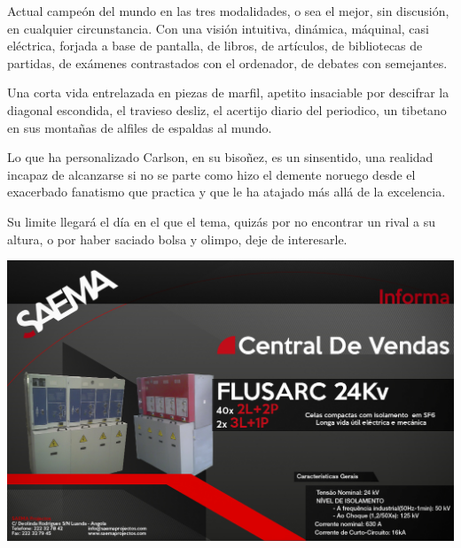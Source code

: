 Actual campeón del mundo en las tres modalidades, o sea el mejor, sin discusión, en cualquier circunstancia. Con una visión intuitiva, dinámica, máquinal, casi eléctrica, forjada a base de pantalla, de libros, de artículos, de bibliotecas de partidas, de exámenes contrastados con el ordenador, de debates con semejantes.

Una corta vida entrelazada en piezas de marfil, apetito insaciable por descifrar la diagonal escondida, el travieso desliz, el acertijo diario del periodico, un tibetano en sus montañas de alfiles de espaldas al mundo.

Lo que ha personalizado Carlson, en su bisoñez, es un sinsentido, una realidad incapaz de alcanzarse si no se parte como hizo el demente noruego desde el exacerbado fanatismo que practica y que le ha atajado más allá de la excelencia.

Su limite llegará el día en el que el tema, quizás por no encontrar un rival a su altura, o por haber saciado bolsa y olimpo, deje de interesarle.


  \vspace{1.5cm}
   \centering
   \includegraphics[scale=0.4]{aihbbgje.jpg}\\
%


\newpage


